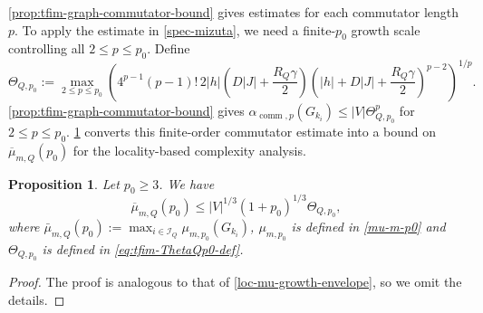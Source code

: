 \documentclass[10pt,reqno]{article}
\numberwithin{equation}{section}
\theoremstyle{plain}
\newtheorem{prop}[thm]{Proposition}
\theoremstyle{definition}
\begin{document}
\cref{prop:tfim-graph-commutator-bound} gives estimates for each commutator length \(p\). To apply the estimate in \cref{spec-mizuta}, we need a finite-\(p_0\) growth scale controlling all \(2\leq p\leq p_0\). Define
\begin{equation}\label{eq:tfim-ThetaQp0-def}
\Theta_{Q,p_0} := \max_{2\leq p\leq p_0} \left( 4^{p-1}(p-1)! \,2|h| \left(D|J|+\frac{R_Q\gamma}{2}\right) \left( |h|+D|J|+\frac{R_Q\gamma}{2} \right)^{p-2} \right)^{1/p}.
\end{equation}
\cref{prop:tfim-graph-commutator-bound} gives \(\alpha_{\operatorname{comm},p}(G_{k_i})\leq |V|\Theta_{Q,p_0}^p\) for \(2\leq p\leq p_0\). \cref{prop:tfim-mizuta-profile} converts this finite-order commutator estimate into a bound on \(\overline\mu_{m,Q}(p_0)\) for the locality-based complexity analysis.

\begin{prop}
\label{prop:tfim-mizuta-profile}
Let \(p_0\geq3\). We have 
\begin{equation}\label{eq:tfim-mubar-BQ-bound}
\overline\mu_{m,Q}(p_0) \leq|V|^{1/3} (1+p_0)^{1/3}\Theta_{Q,p_0}, 
\end{equation}
where $\bar\mu_{m,Q}(p_0):=\max_{i\in\mathcal I_Q}\mu_{m,p_0}(G_{k_i})$, \(\mu_{m,p_0}\) is defined in \cref{mu-m-p0} and $\Theta_{Q,p_0}$ is defined in \cref{eq:tfim-ThetaQp0-def}. 
\end{prop}



\begin{proof}
The proof is analogous to that of \cref{loc-mu-growth-envelope}, so we omit the details.
\end{proof}
\end{document}
